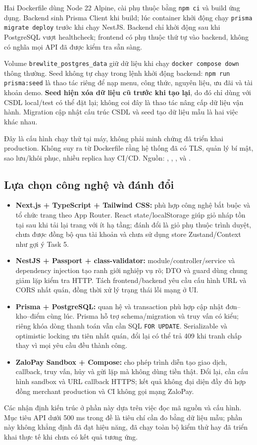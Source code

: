 Hai Dockerfile dùng Node 22 Alpine, cài phụ thuộc bằng \texttt{npm ci} và build ứng dụng. Backend sinh Prisma Client khi build; lúc container khởi động chạy \texttt{prisma migrate deploy} trước khi chạy NestJS. Backend chỉ khởi động sau khi PostgreSQL vượt healthcheck; frontend có phụ thuộc thứ tự vào backend, không có nghĩa mọi API đã được kiểm tra sẵn sàng.

Volume \texttt{brewlite\_postgres\_data} giữ dữ liệu khi chạy \texttt{docker compose down} thông thường. Seed không tự chạy trong lệnh khởi động backend: \texttt{npm run prisma:seed} là thao tác riêng để nạp menu, công thức, nguyên liệu, ưu đãi và tài khoản demo. \textbf{Seed hiện xóa dữ liệu cũ trước khi tạo lại}, do đó chỉ dùng với CSDL local/test có thể đặt lại; không coi đây là thao tác nâng cấp dữ liệu vận hành. Migration cập nhật cấu trúc CSDL và seed tạo dữ liệu mẫu là hai việc khác nhau.

Đây là cấu hình chạy thử tại máy, không phải minh chứng đã triển khai production. Không suy ra từ Dockerfile rằng hệ thống đã có TLS, quản lý bí mật, sao lưu/khôi phục, nhiều replica hay CI/CD. Nguồn: , , ,  và .

\subsection{Lựa chọn công nghệ và đánh đổi}

\begin{itemize}[leftmargin=*,itemsep=4pt]
  \item \textbf{Next.js + TypeScript + Tailwind CSS:} phù hợp công nghệ bắt buộc và tổ chức trang theo App Router. React state/localStorage giúp giỏ nháp tồn tại sau khi tải lại trang với ít hạ tầng; đánh đổi là giỏ phụ thuộc trình duyệt, chưa được đồng bộ qua tài khoản và chưa sử dụng store Zustand/Context như gợi ý Task 5.
  \item \textbf{NestJS + Passport + class-validator:} module/controller/service và dependency injection tạo ranh giới nghiệp vụ rõ; DTO và guard dùng chung giảm lặp kiểm tra HTTP. Tách frontend/backend yêu cầu cấu hình URL và CORS nhất quán, đồng thời xử lý trạng thái lỗi mạng ở UI.
  \item \textbf{Prisma + PostgreSQL:} quan hệ và transaction phù hợp cập nhật đơn--kho--điểm cùng lúc. Prisma hỗ trợ schema/migration và truy vấn có kiểu; riêng khóa dòng thanh toán vẫn cần SQL \texttt{FOR UPDATE}. Serializable và optimistic locking ưu tiên nhất quán, đổi lại có thể trả 409 khi tranh chấp thay vì mọi yêu cầu đều thành công.
  \item \textbf{ZaloPay Sandbox + Compose:} cho phép trình diễn tạo giao dịch, callback, truy vấn, hủy và gửi lặp mà không dùng tiền thật. Đổi lại, cần cấu hình sandbox và URL callback HTTPS; kết quả không đại diện đầy đủ hợp đồng merchant production và CI không gọi mạng ZaloPay.
\end{itemize}

Các nhận định kiến trúc ở phần này dựa trên việc đọc mã nguồn và cấu hình. Mục tiêu API dưới 500 ms trong đề là tiêu chí cần đo bằng dữ liệu mẫu; phần này không khẳng định đã đạt hiệu năng, đã chạy toàn bộ kiểm thử hay đã triển khai thực tế khi chưa có kết quả tương ứng.
